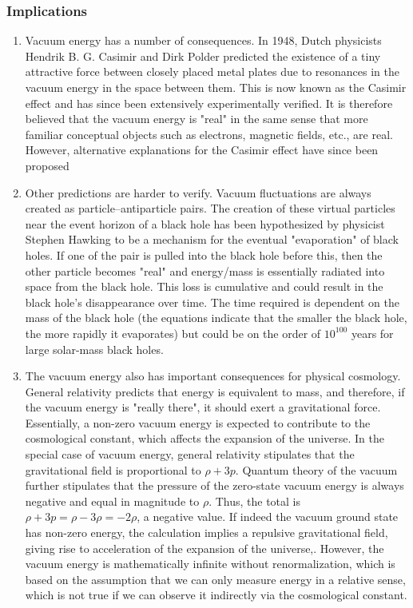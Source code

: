 \subsubsection{Implications}
\begin{enumerate}
	\item Vacuum energy has a number of consequences. In 1948, Dutch physicists Hendrik B. G. Casimir and Dirk Polder predicted the existence of a tiny attractive force between closely placed metal plates due to resonances in the vacuum energy in the space between them. This is now known as the Casimir effect and has since been extensively experimentally verified. It is therefore believed that the vacuum energy is "real" in the same sense that more familiar conceptual objects such as electrons, magnetic fields, etc., are real. However, alternative explanations for the Casimir effect have since been proposed
	\item Other predictions are harder to verify. Vacuum fluctuations are always created as particle–antiparticle pairs. The creation of these virtual particles near the event horizon of a black hole has been hypothesized by physicist Stephen Hawking to be a mechanism for the eventual "evaporation" of black holes. If one of the pair is pulled into the black hole before this, then the other particle becomes "real" and energy/mass is essentially radiated into space from the black hole. This loss is cumulative and could result in the black hole's disappearance over time. The time required is dependent on the mass of the black hole (the equations indicate that the smaller the black hole, the more rapidly it evaporates) but could be on the order of $10^{100}$ years for large solar-mass black holes.
	\item The vacuum energy also has important consequences for physical cosmology. General relativity predicts that energy is equivalent to mass, and therefore, if the vacuum energy is "really there", it should exert a gravitational force. Essentially, a non-zero vacuum energy is expected to contribute to the cosmological constant, which affects the expansion of the universe. In the special case of vacuum energy, general relativity stipulates that the gravitational field is proportional to $ρ + 3p$. Quantum theory of the vacuum further stipulates that the pressure of the zero-state vacuum energy is always negative and equal in magnitude to $ρ$. Thus, the total is $ρ + 3p = ρ − 3ρ = −2ρ$, a negative value. If indeed the vacuum ground state has non-zero energy, the calculation implies a repulsive gravitational field, giving rise to acceleration of the expansion of the universe,. However, the vacuum energy is mathematically infinite without renormalization, which is based on the assumption that we can only measure energy in a relative sense, which is not true if we can observe it indirectly via the cosmological constant.
\end{enumerate}
